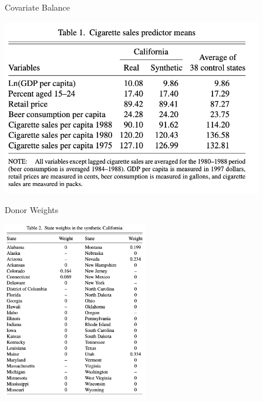 \documentclass[xcolor=pdftex,dvipsnames,table,mathserif,aspectratio=169]{beamer}
\begin{document}
\begin{frame}{Covariate Balance}
\begin{center}
\includegraphics[width=4.5in]{./resources/abadie_1.png}
\end{center}
\end{frame}

\begin{frame}{Donor Weights}
\begin{center}
\includegraphics[width=2.5in]{./resources/abadie_2.png}
\end{center}
\end{frame}
\end{document}
